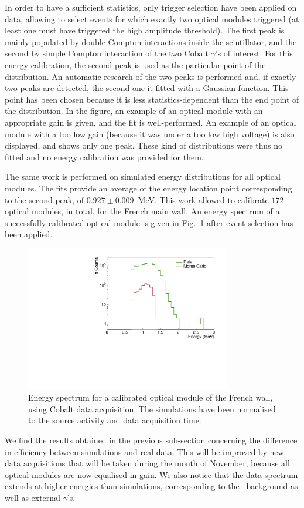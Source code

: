 In order to have a sufficient statistics, only trigger selection have been applied on data, allowing to select events for which exactly two optical modules triggered (at least one must have triggered the high amplitude threshold).
The first peak is mainly populated by double Compton interactions inside the scintillator, and the second by simple Compton interaction of the two Cobalt $\gamma$'s of interest.
For this energy calibration, the second peak is used as the particular point of the distribution.
An automatic research of the two peaks is performed and, if exactly two peaks are detected, the second one it fitted with a Gaussian function.
This point has been chosen because it is less statistics-dependent than the end point of the distribution.
In the figure, an example of an optical module with an appropriate gain is given, and the fit is well-performed.
An example of an optical module with a too low gain (because it was under a too low high voltage) is also displayed, and shows only one peak.
These kind of distributions were thus no fitted and no energy calibration was provided for them.

The same work is performed on simulated energy distributions for all optical modules.
The fits provide an average of the energy location point corresponding to the second peak, of $0.927\pm0.009$~MeV.
This work allowed to calibrate $172$ optical modules, in total, for the French main wall.
An energy spectrum of a successfully calibrated optical module is given in Fig.~\ref{fig:calib_energy_OM} after event selection has been applied.
\begin{figure}[h]
  \centering
  \includegraphics[width=0.8\textwidth]{CobaltStudy/fig_CobaltStudy/calib_energy_done.pdf}
  \caption{Energy spectrum for a calibrated optical module of the French wall, using Cobalt data acquisition.
    The simulations have been normalised to the source activity and data acquisition time.
    \label{fig:calib_energy_OM}}
\end{figure}
We find the results obtained in the previous sub-section concerning the difference in efficiency between simulations and real data.
This will be improved by new data acquisitions that will be taken during the month of November, because all optical modules are now equalised in gain.
We also notice that the data spectrum extends at higher energies than simulations, corresponding to the \Tl\ background as well as external $\gamma$'s.


